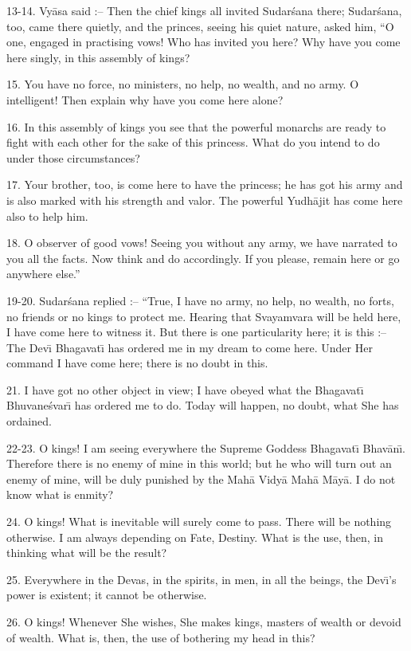 13-14. Vy\=asa said :-- Then the chief kings all invited Sudar\'sana there; Sudar\'sana, too, came there quietly, and the princes, seeing his quiet nature, asked him, ``O one, engaged in practising vows! Who has invited you here? Why have you come here singly, in this assembly of kings?

15. You have no force, no ministers, no help, no wealth, and no army. O intelligent! Then explain why have you come here alone?

16. In this assembly of kings you see that the powerful monarchs are ready to fight with each other for the sake of this princess. What do you intend to do under those circumstances?

17. Your brother, too, is come here to have the princess; he has got his army and is also marked with his strength and valor. The powerful Yudh\=ajit has come here also to help him.

18. O observer of good vows! Seeing you without any army, we have narrated to you all the facts. Now think and do accordingly. If you please, remain here or go anywhere else.''

19-20. Sudar\'sana replied :-- ``True, I have no army, no help, no wealth, no forts, no friends or no kings to protect me. Hearing that Svayamvara will be held here, I have come here to witness it. But there is one particularity here; it is this :-- The Dev\={\i} Bhagavat\={\i} has ordered me in my dream to come here. Under Her command I have come here; there is no doubt in this.

21. I have got no other object in view; I have obeyed what the Bhagavat\={\i} Bhuvane\'svar\={\i} has ordered me to do. Today will happen, no doubt, what She has ordained.

22-23. O kings! I am seeing everywhere the Supreme Goddess Bhagavat\={\i} Bhav\=an\={\i}. Therefore there is no enemy of mine in this world; but he who will turn out an enemy of mine, will be duly punished by the Mah\=a Vidy\=a Mah\=a M\=ay\=a. I do not know what is enmity?

24. O kings! What is inevitable will surely come to pass. There will be nothing otherwise. I am always depending on Fate, Destiny. What is the use, then, in thinking what will be the result?

25. Everywhere in the Devas, in the spirits, in men, in all the beings, the Dev\={\i}'s power is existent; it cannot be otherwise.

26. O kings! Whenever She wishes, She makes kings, masters of wealth or devoid of wealth. What is, then, the use of bothering my head in this?

